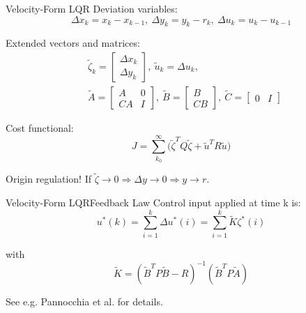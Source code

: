 \begin{frame}{Velocity-Form LQR}
	Deviation variables:
	\begin{equation}\label{eq:VelocityVariables}
		\Delta x_k = x_k - x_{k-1}, \ \Delta y_k = y_k - r_k, \ \Delta u_k = u_k-u_{k-1}
	\end{equation}
	
	Extended vectors and matrices:
	\begin{equation} \label{eq1}
		\begin{split}
			& \tilde{\zeta}_k = \begin{bmatrix} \Delta x_k \\ \Delta y_k	\end{bmatrix}, \ \tilde{u}_k = \Delta u_k, \\
			&\tilde{A} = \begin{bmatrix} A & 0 \\ CA & I	\end{bmatrix}, \ 
			\tilde{B} = \begin{bmatrix} B \\ CB	\end{bmatrix}, \ \tilde{C} = \begin{bmatrix} 0 & I	\end{bmatrix}
		\end{split}
	\end{equation}

	Cost functional:
	\begin{equation}\label{eq:LagrangeProblemDeviation}
		J = \sum_{k_0}^{\infty} \big(\tilde{\zeta}^TQ\tilde{\zeta} + \tilde{u}^TR\tilde{u}\big)
	\end{equation}

	Origin regulation! If $\tilde{\zeta} \rightarrow 0 \Rightarrow  \Delta y \rightarrow 0 \Rightarrow  y \rightarrow r$.
\end{frame}


\begin{frame}{Velocity-Form LQR}{Feedback Law}
	Control input applied at time k is:
	\begin{equation}\label{eq:ActualControlApplied}
		u^*(k) = \sum_{i=1}^{k} \Delta u^*(i) = \sum_{i=1}^{k} \tilde{K}\zeta^*(i)
	\end{equation}

	with
	\begin{equation}
		\tilde{K} = (\tilde{B}^TP\tilde{B}-R)^{-1}(\tilde{B}^TP\tilde{A})
	\end{equation}

	See e.g. Pannocchia et al. \cite{Pannocchia2015a} for details.
\end{frame}


